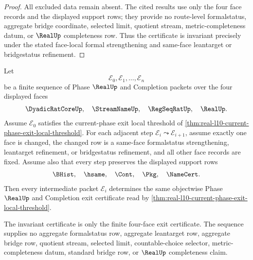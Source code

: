 \begin{proof}
All excluded data remain absent. The cited results use only the four face records and the displayed support rows; they provide no route-level formalstatus, aggregate bridge coordinate, selected limit, quotient stream, metric-completeness datum, or $\RealUp$ completeness row. Thus the certificate is invariant precisely under the stated face-local formal strengthening and same-face leantarget or bridgestatus refinement.
\end{proof}

\begin{theorem}
\label{thm:real-l10-face-formal-upgrade-chain-invariance}
Let
$$
\mathcal E_0,\mathcal E_1,\ldots,\mathcal E_n
$$
be a finite sequence of Phase $\RealUp$ and Completion packets over the four displayed faces
$$
\DyadicRatCoreUp,\quad \StreamNameUp,\quad \RegSeqRatUp,\quad \RealUp .
$$
Assume $\mathcal E_0$ satisfies the current-phase exit local threshold of \autoref{thm:real-l10-current-phase-exit-local-threshold}. For each adjacent step $\mathcal E_i\leadsto\mathcal E_{i+1}$, assume exactly one face is changed, the changed row is a same-face formalstatus strengthening, leantarget refinement, or bridgestatus refinement, and all other face records are fixed. Assume also that every step preserves the displayed support rows
$$
\BHist,\quad \hsame,\quad \Cont,\quad \Pkg,\quad \NameCert .
$$
Then every intermediate packet $\mathcal E_i$ determines the same objectwise Phase $\RealUp$ and Completion exit certificate read by \autoref{thm:real-l10-current-phase-exit-local-threshold}.

The invariant certificate is only the finite four-face exit certificate. The sequence supplies no aggregate formalstatus row, aggregate leantarget row, aggregate bridge row, quotient stream, selected limit, countable-choice selector, metric-completeness datum, standard bridge row, or $\RealUp$ completeness claim.
\end{theorem}

